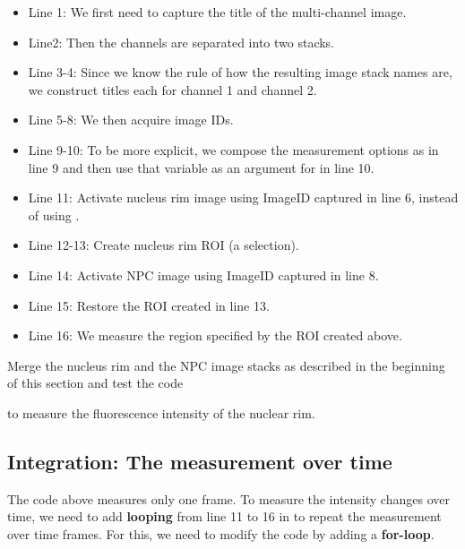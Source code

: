 \begin{itemize}
    \item Line 1: We first need to capture the title of the multi-channel image. 
    \item Line2: Then the channels are separated into two stacks.
    \item Line 3-4: Since we know the rule of how the resulting image stack names are, we construct titles each for channel 1 and channel 2. 
    \item Line 5-8: We then acquire image IDs.
    \item Line 9-10: To be more explicit, we compose the measurement options as  in line 9 and then use that variable  as an argument for  in line 10.
    \item Line 11: Activate nucleus rim image using ImageID captured in line 6, instead of using .
    \item Line 12-13: Create nucleus rim ROI (a selection).
    \item Line 14: Activate NPC image using ImageID captured in line 8.
    \item Line 15: Restore the ROI created in line 13.
    \item Line 16: We measure the region specified by the ROI created above.
\end{itemize}

\begin{indentexercise}{3}
Merge the nucleus rim and the NPC image stacks as described in the beginning of this section and test the code


to measure the fluorescence intensity of the nuclear rim. 
\end{indentexercise}

\subsection{Integration: The measurement over time}

The code above measures only one frame. To measure the intensity changes over time, we need to add \textbf{looping} from line 11 to 16 in  to repeat the measurement over time frames. For this, we need to modify the code by adding a \textbf{for-loop}.




